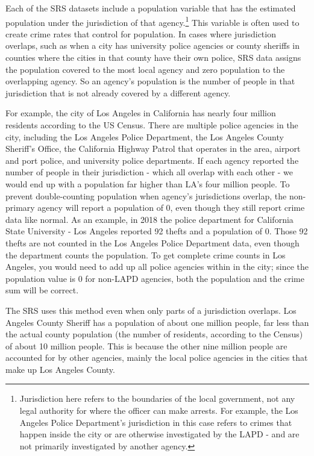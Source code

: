 \documentclass[
]{krantz}
\begin{document}
Each of the SRS datasets include a population variable that
has the estimated population under the jurisdiction of that
agency.\footnote{Jurisdiction here refers to the boundaries
  of the local government, not any legal authority for where
  the officer can make arrests. For example, the Los Angeles
  Police Department's jurisdiction in this case refers to
  crimes that happen inside the city or are otherwise
  investigated by the LAPD - and are not primarily
  investigated by another agency.} This variable is often
used to create crime rates that control for population. In
cases where jurisdiction overlaps, such as when a city has
university police agencies or county sheriffs in counties
where the cities in that county have their own police, SRS
data assigns the population covered to the most local agency
and zero population to the overlapping agency. So an
agency's population is the number of people in that
jurisdiction that is not already covered by a different
agency.

For example, the city of Los Angeles in California has
nearly four million residents according to the US Census.
There are multiple police agencies in the city, including
the Los Angeles Police Department, the Los Angeles County
Sheriff's Office, the California Highway Patrol that
operates in the area, airport and port police, and
university police departments. If each agency reported the
number of people in their jurisdiction - which all overlap
with each other - we would end up with a population far
higher than LA's four million people. To prevent
double-counting population when agency's jurisdictions
overlap, the non-primary agency will report a population of
0, even though they still report crime data like normal. As
an example, in 2018 the police department for California
State University - Los Angeles reported 92 thefts and a
population of 0. Those 92 thefts are not counted in the Los
Angeles Police Department data, even though the department
counts the population. To get complete crime counts in Los
Angeles, you would need to add up all police agencies within
in the city; since the population value is 0 for non-LAPD
agencies, both the population and the crime sum will be
correct.

The SRS uses this method even when only parts of a
jurisdiction overlaps. Los Angeles County Sheriff has a
population of about one million people, far less than the
actual county population (the number of residents, according
to the Census) of about 10 million people. This is because
the other nine million people are accounted for by other
agencies, mainly the local police agencies in the cities
that make up Los Angeles County.
\end{document}
